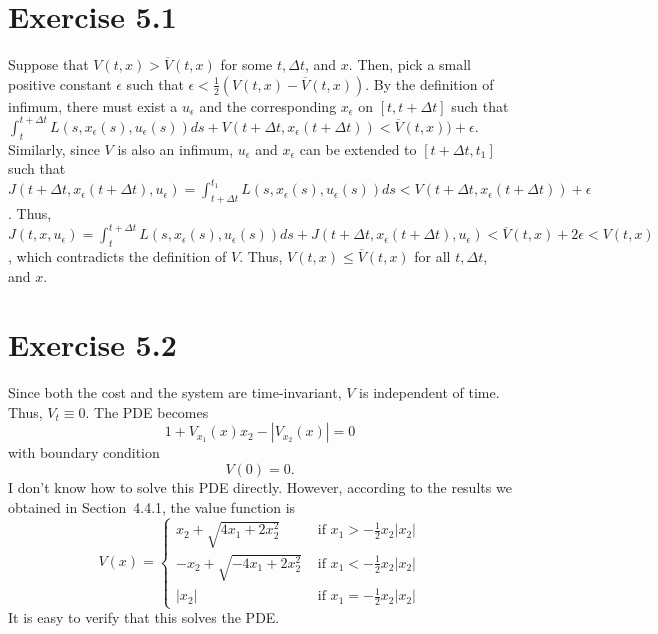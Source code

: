 \documentclass[11pt]{report}
\begin{document}

\section*{Exercise 5.1}
Suppose that $V(t,x) > \overline{V}(t,x)$ for some $t, \Delta t$, and $x$. Then, pick a small positive constant $\epsilon$ such that $\epsilon < \frac{1}{2}(V(t,x) - \overline{V}(t,x))$. By the definition of infimum, there must exist a $u_\epsilon$ and the corresponding $x_\epsilon$ on $[t, t+\Delta t]$ such that $\int_{t}^{t+\Delta t} L(s, x_\epsilon(s), u_\epsilon(s)) d s+V(t+\Delta t, x_\epsilon(t+\Delta t)) < \overline{V}(t,x)) + \epsilon$. Similarly, since $V$ is also an infimum, $u_\epsilon$ and $x_\epsilon$ can be extended to $[t+\Delta t, t_1]$ such that $J(t+\Delta t,x_\epsilon(t+\Delta t), u_\epsilon) = \int_{t+\Delta t}^{t_1} L(s, x_\epsilon(s), u_\epsilon(s)) d s < V(t+\Delta t, x_\epsilon(t+\Delta t)) + \epsilon$. Thus, $J(t,x,u_\epsilon) = \int_{t}^{t+\Delta t} L(s, x_\epsilon(s), u_\epsilon(s)) d s + J(t+\Delta t,x_\epsilon(t+\Delta t), u_\epsilon) < \overline{V}(t, x) + 2\epsilon < V(t,x)$, which contradicts the definition of $V$. Thus, $V(t,x) \leq \overline{V}(t,x)$ for all $t, \Delta t$, and $x$.

\section*{Exercise 5.2}
Since both the cost and the system are time-invariant, $V$ is independent of time. Thus, $V_t \equiv 0$. The PDE becomes
\[
1+V_{x_1}(x)x_2 - \left|V_{x_2}(x)\right| = 0
\]
with boundary condition
\[
V(0) = 0.
\]
I don't know how to solve this PDE directly. However, according to the results we obtained in Section~{4.4.1}, the value function is
\[
V(x) = \left\{\begin{array}{ll}
x_{2}+\sqrt{4 x_{1}+2 x_{2}^{2}} & \text { if } x_{1}>-\frac{1}{2} x_{2}\left|x_{2}\right| \\
-x_{2}+\sqrt{-4 x_{1}+2 x_{2}^{2}} & \text { if } x_{1}<-\frac{1}{2} x_{2}\left|x_{2}\right| \\
\left|x_{2}\right| & \text { if } x_{1}=-\frac{1}{2} x_{2}\left|x_{2}\right|
\end{array}\right.
\]
It is easy to verify that this solves the PDE.
\end{document}
